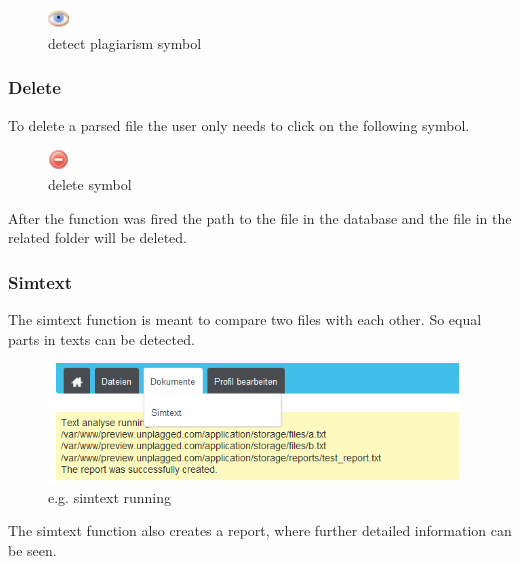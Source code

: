 \begin{figure}[!ht]
  \centering
    \includegraphics[width=0.05\textwidth]{images/eye.png}
  \caption{detect plagiarism symbol}
  \label{detect plagiarism symbol}
\end{figure}

\subsubsection{Delete}

To delete a parsed file the user only needs to click on the following symbol.

\begin{figure}[!ht]
  \centering
    \includegraphics[width=0.05\textwidth]{images/delete.png}
  \caption{delete symbol}
  \label{fig:delete symbol}
\end{figure}

After the function was fired the path to the file in the database and the file in the related folder will be deleted.

\subsubsection{Simtext}

The simtext function is meant to compare two files with each other. So equal parts in texts can be detected.

\begin{figure}[!ht]
  \centering
    \includegraphics[width=0.97\textwidth]{images/basic_functionalities/simtext_running.png}
  \caption{e.g. simtext running}
  \label{fig: simtext running}
\end{figure}

The simtext function also creates a report, where further detailed information can be seen.

